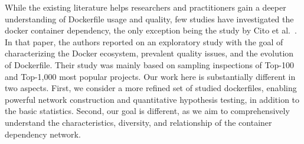 \documentclass[sigconf]{acmart}
\begin{document}
While the existing literature helps researchers and practitioners gain a deeper understanding of Dockerfile usage
and quality, few studies have investigated the docker container dependency,
the only exception being the study by Cito et al.~\cite{cito2017empirical}. In that
paper, the authors reported on an exploratory study with the
goal of characterizing the Docker ecosystem, prevalent quality
issues, and the evolution of Dockerfile. Their study was mainly
based on sampling inspections of Top-100 and Top-1,000 most
popular projects. Our work here is substantially different in
two aspects. First, we consider a more refined set of studied
dockerfiles, enabling powerful network construction and quantitative hypothesis testing, in addition to the basic statistics. 
Second,
our goal is different, as we aim to comprehensively understand
the characteristics, diversity, and relationship of the container dependency network.




\end{document}
